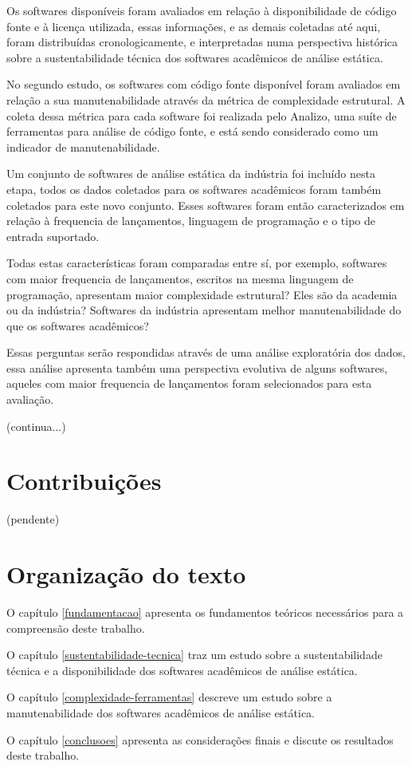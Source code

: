 Os softwares disponíveis foram avaliados em relação à disponibilidade de código
fonte e à licença utilizada, essas informações, e as demais coletadas até aqui,
foram distribuídas cronologicamente, e interpretadas numa perspectiva histórica
sobre a sustentabilidade técnica dos softwares acadêmicos de análise estática.

No segundo estudo, os softwares com código fonte disponível foram avaliados em
relação a sua manutenabilidade através da métrica de complexidade estrutural. A
coleta dessa métrica para cada software foi realizada pelo Analizo, uma suíte
de ferramentas para análise de código fonte, e está sendo considerado como um
indicador de manutenabilidade.

Um conjunto de softwares de análise estática da indústria foi incluído nesta
etapa, todos os dados coletados para os softwares acadêmicos foram também
coletados para este novo conjunto. Esses softwares foram então caracterizados em
relação à frequencia de lançamentos, linguagem de programação e o tipo de
entrada suportado.

Todas estas características foram comparadas entre sí, por exemplo, softwares
com maior frequencia de lançamentos, escritos na mesma linguagem de
programação, apresentam maior complexidade estrutural? Eles são da academia ou
da indústria? Softwares da indústria apresentam melhor manutenabilidade do que
os softwares acadêmicos?

Essas perguntas serão respondidas através de uma análise exploratória dos
dados, essa análise apresenta também uma perspectiva evolutiva de alguns
softwares, aqueles com maior frequencia de lançamentos foram selecionados para
esta avaliação.

(continua...)

\section{Contribuições}

(pendente)

\section{Organização do texto}

O capítulo \ref{fundamentacao} apresenta os fundamentos teóricos necessários
para a compreensão deste trabalho.

O capítulo \ref{sustentabilidade-tecnica} traz um estudo sobre a
sustentabilidade técnica e a disponibilidade dos softwares acadêmicos de
análise estática.

O capítulo \ref{complexidade-ferramentas} descreve um estudo sobre a
manutenabilidade dos softwares acadêmicos de análise estática.

O capítulo \ref{conclusoes} apresenta as considerações finais e discute os
resultados deste trabalho.
